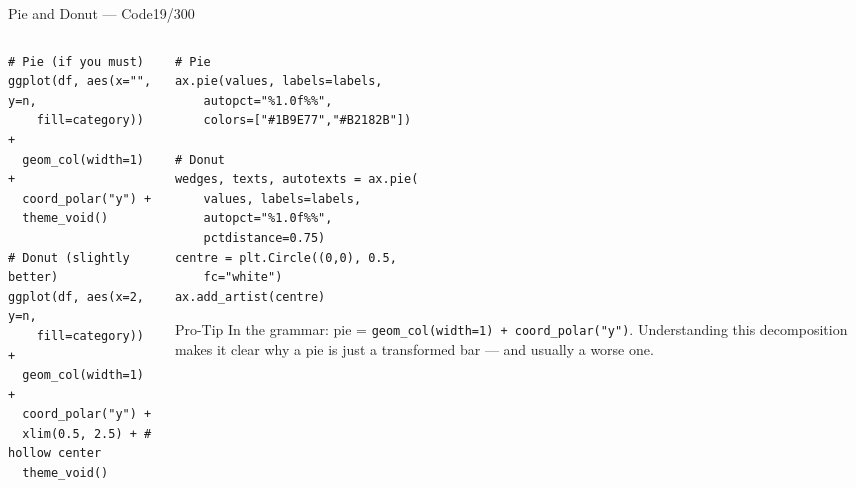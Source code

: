 \documentclass[10pt]{beamer}
\newcommand{\smark}[1]{\hfill{\scriptsize\color{codegray}#1}}
\begin{document}
\begin{frame}[fragile]{Pie and Donut --- Code}\smark{19/300}
\begin{columns}[T]
\begin{column}{0.48\textwidth}
\begin{lstlisting}[style=Rstyle]
# Pie (if you must)
ggplot(df, aes(x="", y=n,
    fill=category)) +
  geom_col(width=1) +
  coord_polar("y") +
  theme_void()

# Donut (slightly better)
ggplot(df, aes(x=2, y=n,
    fill=category)) +
  geom_col(width=1) +
  coord_polar("y") +
  xlim(0.5, 2.5) + # hollow center
  theme_void()
\end{lstlisting}
\end{column}
\begin{column}{0.48\textwidth}
\begin{lstlisting}[style=Pystyle]
# Pie
ax.pie(values, labels=labels,
    autopct="%1.0f%%",
    colors=["#1B9E77","#B2182B"])

# Donut
wedges, texts, autotexts = ax.pie(
    values, labels=labels,
    autopct="%1.0f%%",
    pctdistance=0.75)
centre = plt.Circle((0,0), 0.5,
    fc="white")
ax.add_artist(centre)
\end{lstlisting}
\vspace{0.1cm}
\begin{alertblock}{Pro-Tip}
    \scriptsize In the grammar: pie = \texttt{geom\_col(width=1) + coord\_polar("y")}. Understanding this decomposition makes it clear why a pie is just a transformed bar --- and usually a worse one.
\end{alertblock}
\end{column}
\end{columns}
\end{frame}
\end{document}
